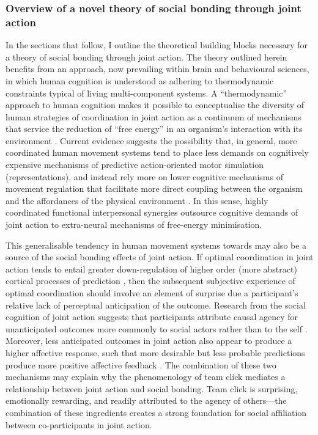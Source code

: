 \begin{CJK}{UTF8}{gbsn}
\subsubsection{Overview of a novel theory of social bonding through joint action}

In the sections that follow, I outline the theoretical building blocks necessary for a theory of social bonding through joint action.  The theory outlined herein benefits from an approach, now prevailing within brain and behavioural sciences, in which human cognition is understood as adhering to thermodynamic constraints typical of living multi-component systems.  A ``thermodynamic'' approach to human cognition makes it possible to conceptualise the diversity of human strategies of coordination in joint action as a continuum of mechanisms that service the reduction of ``free energy'' in an organism's interaction with its environment \citep{Friston2010,Yufik2013,Yufik2017}.  Current evidence suggests the possibility that, in general, more coordinated human movement systems tend to place less demands on cognitively expensive mechanisms of predictive action-oriented motor simulation (representations), and instead rely more on lower cognitive mechanisms of movement regulation that facilitate more direct coupling between the organism and the affordances of the physical environment \citep{Bourbousson2011,RKiouak2016}.  In this sense, highly coordinated functional interpersonal synergies outsource cognitive demands of joint action to extra-neural mechanisms of free-energy minimisation.

This generalisable tendency in human movement systems towards  may also be a source of the social bonding effects of joint action.  If optimal coordination in joint action tends to entail greater down-regulation of higher order (more abstract) cortical processes of prediction \citep{Dietrich2004b}, then the subsequent subjective experience of optimal coordination should involve an element of surprise due a participant's relative lack of perceptual anticipation of the outcome.  Research from the social cognition of joint action suggests that participants attribute causal agency for unanticipated outcomes more commonly to social actors rather than to the self \citep{Sato2008}.  Moreover, less anticipated outcomes in joint action also appear to produce a higher affective response, such that more desirable but less probable predictions produce more positive affective feedback \citep{Chetverikov2016}.  The combination of these two mechanisms may explain why the phenomenology of team click mediates a relationship between joint action and social bonding.  Team click is surprising, emotionally rewarding, and readily attributed to the agency of others---the combination of these ingredients creates a strong foundation for social affiliation between co-participants in joint action.



\end{CJK}
